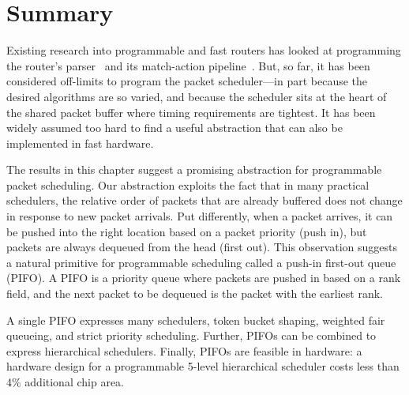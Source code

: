 \section{Summary}
\label{s:pifo_summary}
Existing research into programmable and fast routers has looked at programming
the router's parser~\cite{glen_parsing} and its match-action
pipeline~\cite{rmt}. But, so far, it has been considered off-limits to program
the packet scheduler---in part because the desired algorithms are so varied,
and because the scheduler sits at the heart of the shared packet buffer where
timing requirements are tightest.  It has been widely assumed too hard to find
a useful abstraction that can also be implemented in fast hardware.

The results in this chapter suggest a promising abstraction for programmable
packet scheduling.  Our abstraction exploits the fact that in many practical
schedulers, the relative order of packets that are already buffered does not
change in response to new packet arrivals.  Put differently, when a packet
arrives, it can be pushed into the right location based on a packet priority
(push in), but packets are always dequeued from the head (first out).  This
observation suggests a natural primitive for programmable scheduling called a
push-in first-out queue (PIFO). A PIFO is a priority queue where packets are
pushed in based on a rank field, and the next packet to be dequeued is the
packet with the earliest rank.

A single PIFO expresses many schedulers, \eg token bucket shaping, weighted
fair queueing, and strict priority scheduling.  Further,  PIFOs  can  be
combined  to  express  hierarchical  schedulers.   Finally, PIFOs  are
feasible  in hardware:   a hardware design for a programmable 5-level
hierarchical scheduler costs less than 4\% additional chip area.
